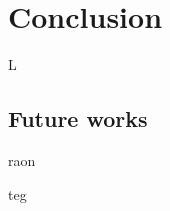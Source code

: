 \chapter{Conclusion}
 L
 \section{Future works}


raon \cite{TaofeekOrekan2018}

teg \cite{Heidemann2012}